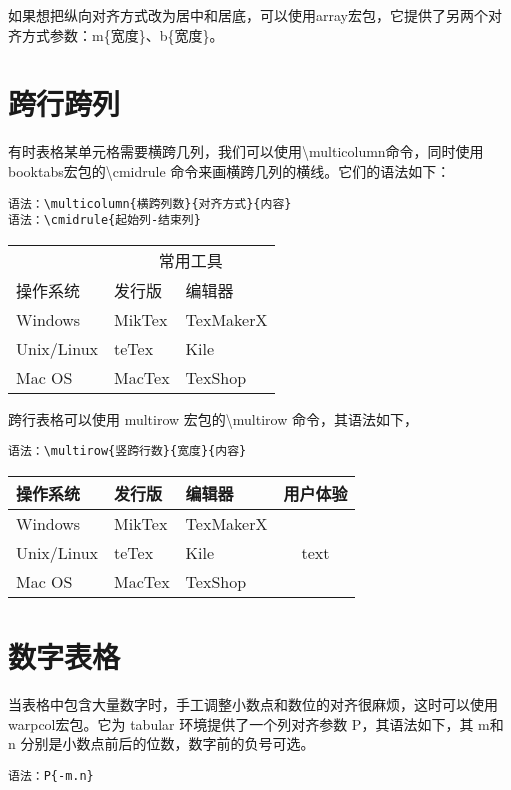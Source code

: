\documentclass[UTF8]{article}
\begin{document}
如果想把纵向对齐方式改为居中和居底，可以使用array宏包，它提供了另两个对齐方式参数：m\{宽度\}、b\{宽度\}。

\section{跨行跨列}
有时表格某单元格需要横跨几列，我们可以使用\textbackslash multicolumn命令，同时使用booktabs宏包的\textbackslash cmidrule 命令来画横跨几列的横线。它们的语法如下：
\begin{lstlisting}
语法：\multicolumn{横跨列数}{对齐方式}{内容}
语法：\cmidrule{起始列-结束列}
\end{lstlisting}
\begin{table}[htbp]
\centering
\begin{tabular}{lll}
	\toprule
	& \multicolumn{2}{c}{常用工具} \\
	\cmidrule{2-3}
	操作系统 & 发行版 & 编辑器 \\	
	\midrule
	Windows & MikTex & TexMakerX \\
	Unix/Linux & teTex & Kile \\
	Mac OS & MacTex & TexShop \\
	\bottomrule
\end{tabular}
\end{table}

跨行表格可以使用 multirow 宏包的\textbackslash multirow 命令，其语法如下，
\begin{lstlisting}
语法：\multirow{竖跨行数}{宽度}{内容}
\end{lstlisting}
\begin{table}[htbp]
\centering
\begin{tabular}{lllc}
	\toprule
	操作系统 & 发行版 & 编辑器 &用户体验\\	
	\midrule
	Windows & MikTex & TexMakerX &
	\multirow{3}{*}{\centering text}\\
	Unix/Linux & teTex & Kile \\
	Mac OS & MacTex & TexShop \\
	\bottomrule
\end{tabular}
\end{table}


\section{数字表格}
当表格中包含大量数字时，手工调整小数点和数位的对齐很麻烦，这时可以使用warpcol宏包。它为 tabular 环境提供了一个列对齐参数 P，其语法如下，其 m和 n 分别是小数点前后的位数，数字前的负号可选。
\begin{lstlisting}
语法：P{-m.n}
\end{lstlisting}
\end{document}
